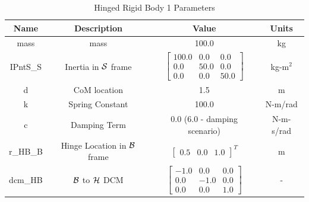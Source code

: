 \begin{table}[htbp]
	\caption{Hinged Rigid Body 1 Parameters}
	\label{tab:panel1}
	\centering \fontsize{10}{10}\selectfont
	\begin{tabular}{| c | c | c | c |} %
		\hline
		\textbf{Name}  & \textbf{Description}  & \textbf{Value} & \textbf{Units} \\
		\hline
		mass  & mass & 100.0 & kg \\
		\hline
		IPntS\_S & Inertia in $\cal{S}$ frame & $\begin{bmatrix}
		100.0 & 0.0 & 0.0\\
		0.0 & 50.0 & 0.0\\
		0.0 & 0.0 & 50.0
		\end{bmatrix}$ & kg-m$^2$ \\
		\hline
		d & CoM location & 1.5 & m \\
		\hline
		k & Spring Constant & 100.0 & N-m/rad \\
		\hline
		c & Damping Term & 0.0 (6.0 - damping scenario) & N-m-s/rad \\
		\hline
		r\_HB\_B & Hinge Location in $\cal{B}$ frame & $\begin{bmatrix}
		0.5 & 0.0 & 1.0 \end{bmatrix}^T$ & m \\
		\hline
		dcm\_HB & $\cal{B}$ to $\cal{H}$ DCM & $\begin{bmatrix}
		-1.0 & 0.0 & 0.0\\
		0.0 & -1.0 & 0.0\\
		0.0 & 0.0 & 1.0
		\end{bmatrix}$ & - \\
		\hline
	\end{tabular}
\end{table}

